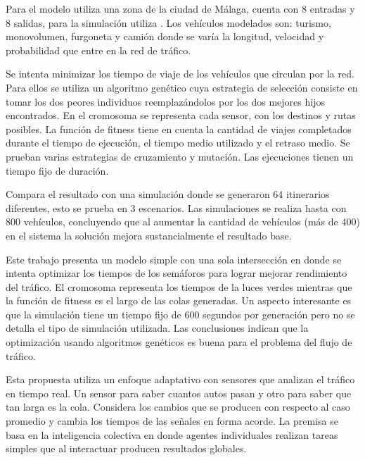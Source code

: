 \begin{itemize}
\begin{item}
		Para el modelo utiliza una zona  de la ciudad de Málaga, cuenta con 8 entradas y 8 salidas, para la simulación utiliza \citet{SUMO}. Los vehículos modelados son: turismo, monovolumen, furgoneta y camión donde se varía la longitud, velocidad y probabilidad que entre en la red de tráfico.
		
		Se intenta minimizar los tiempo de viaje de los vehículos que circulan por la red. Para ellos se utiliza un algoritmo genético cuya estrategia de selección consiste en tomar los dos peores individuos reemplazándolos por los dos mejores hijos encontrados. En el cromosoma se representa cada sensor, con los destinos y rutas posibles. La función de fitness tiene en cuenta la cantidad de viajes completados durante el tiempo de ejecución, el tiempo medio utilizado y el retraso medio. Se prueban varias estrategias de cruzamiento y mutación. Las ejecuciones tienen un tiempo fijo de duración.
		
		
		Compara el resultado con una simulación donde se generaron 64 itinerarios diferentes, esto se prueba en 3 escenarios. Las simulaciones se realiza hasta con 800 vehículos, concluyendo que al aumentar la cantidad de vehículos (más de 400) en el sistema la solución mejora sustancialmente el resultado base.
		
	\end{item}	
	
	
	\begin{item}
		Este trabajo presenta un modelo simple con una sola intersección en donde se intenta optimizar los tiempos de los semáforos para lograr mejorar rendimiento del tráfico. El cromosoma representa los tiempos de la luces verdes mientras que la función de fitness es el largo de las colas generadas. Un aspecto interesante es que la simulación tiene un tiempo fijo de 600 segundos por generación pero no se detalla el tipo de simulación utilizada. Las conclusiones indican que la optimización usando algoritmos genéticos  es buena para el problema del flujo de tráfico.	
	\end{item}	
	
	
	\begin{item}
		\bibentry{Montana1996}
		Esta propuesta utiliza un enfoque adaptativo con sensores que analizan el tráfico en tiempo real. Un sensor para saber cuantos autos pasan y otro para saber que tan larga es la cola. Considera los cambios que se producen con respecto al caso promedio y cambia los tiempos de las señales en forma acorde.
		La premisa se basa en la inteligencia colectiva en donde agentes individuales realizan tareas simples que al interactuar producen resultados globales.
		

\end{item}
\end{itemize}
